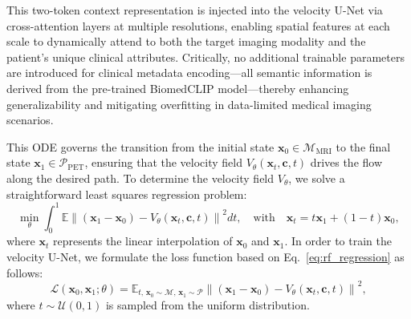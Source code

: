 \documentclass{article}
\begin{document}
This two-token context representation is injected into the velocity U-Net via cross-attention layers at multiple resolutions, enabling spatial features at each scale to dynamically attend to both the target imaging modality and the patient’s unique clinical attributes. Critically, no additional trainable parameters are introduced for clinical metadata encoding—all semantic information is derived from the pre-trained BiomedCLIP model—thereby enhancing generalizability and mitigating overfitting in data-limited medical imaging scenarios.

This ODE governs the transition from the initial state $\mathbf{x}_0 \in \mathcal{M}_{\text{MRI}}$ to the final state $\mathbf{x}_1 \in \mathcal{P}_{\text{PET}}$, ensuring that the velocity field $V_\theta(\mathbf{x}_t, \mathbf{c}, t)$ drives the flow along the desired path. To determine the velocity field $V_\theta$, we solve a straightforward least squares regression problem:
\begin{equation}
\min_{\theta} \int_0^1 \mathbb{E} \left\| (\mathbf{x}_1 - \mathbf{x}_0) - V_\theta(\mathbf{x}_t, \mathbf{c}, t) \right\|^2 dt, \quad \text{with} \quad \mathbf{x}_t = t\mathbf{x}_1 + (1-t)\mathbf{x}_0,
\label{eq:rf_regression}
\end{equation}
where $\mathbf{x}_t$ represents the linear interpolation of $\mathbf{x}_0$ and $\mathbf{x}_1$. In order to train the velocity U-Net, we formulate the loss function based on Eq.~\eqref{eq:rf_regression} as follows:
\begin{equation}
\mathcal{L}(\mathbf{x}_0, \mathbf{x}_1; \theta) = \mathbb{E}_{t,\, \mathbf{x}_0 \sim \mathcal{M},\, \mathbf{x}_1 \sim \mathcal{P}} \left\| (\mathbf{x}_1 - \mathbf{x}_0) - V_\theta(\mathbf{x}_t, \mathbf{c}, t) \right\|^2,
\label{eq:rf_loss}
\end{equation}
where $t \sim \mathcal{U}(0, 1)$ is sampled from the uniform distribution.
\end{document}
